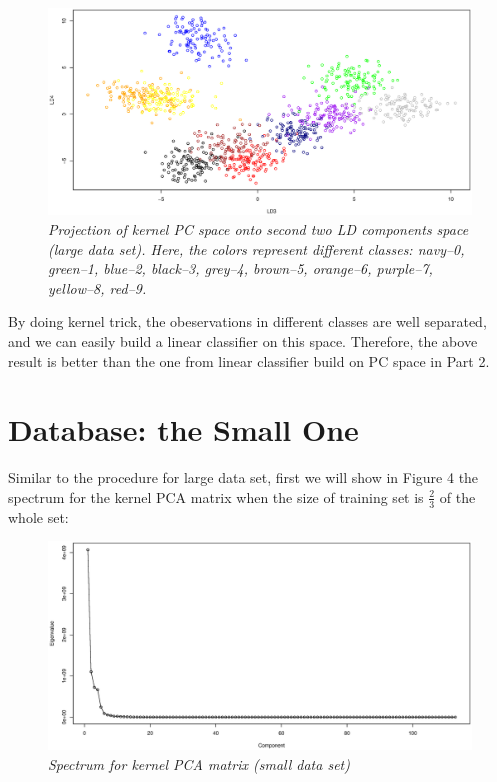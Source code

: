 \documentclass{article}
\begin{document}
\begin{figure}[htp]
\centering
\includegraphics[width=12.1cm]{large_kpca_lda_poly_LD34.eps}
\caption{\textit{Projection of kernel PC space onto second two LD components space (large data set). Here, the colors represent different classes: navy--0, green--1, 
blue--2, black--3, grey--4, brown--5, orange--6, purple--7, yellow--8, red--9.}}
\end{figure}

By doing kernel trick, the obeservations in different classes are well separated, and we can easily build a linear classifier on this space.
Therefore, the above result is better than the one from linear classifier build on PC space in Part 2.

\goodbreak

\newpage

\section{Database: the Small One}

Similar to the procedure for large data set, first we will show in Figure 4 the spectrum for the kernel PCA matrix when the size of training set 
is $\frac{2}{3}$ of the whole set:

\begin{figure}[htp]
\centering
\includegraphics[width=12.1cm]{small_kpca_spectrum_poly.eps}
\caption{\textit{Spectrum for kernel PCA matrix (small data set)}}
\end{figure}
\end{document}
